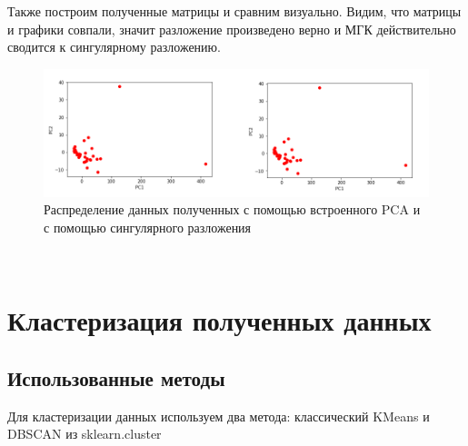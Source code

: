 \documentclass[a4]{article}
\begin{document}
	Также построим полученные матрицы и сравним визуально. Видим, что матрицы и графики совпали, значит разложение произведено верно и МГК действительно сводится к сингулярному разложению.
	\begin{figure}[h!]
		\includegraphics[width=\textwidth]{out.png}\caption[Распределение данных полученных с помощью встроенного PCA и с помощью сингулярного разложения]{Распределение данных полученных с помощью встроенного PCA и с помощью сингулярного разложения}
	\end{figure} \\

	
	\section{Кластеризация полученных данных}
	\subsection{Использованные методы}
	Для кластеризации данных используем два метода: классический KMeans и DBSCAN из sklearn.cluster
\end{document}
